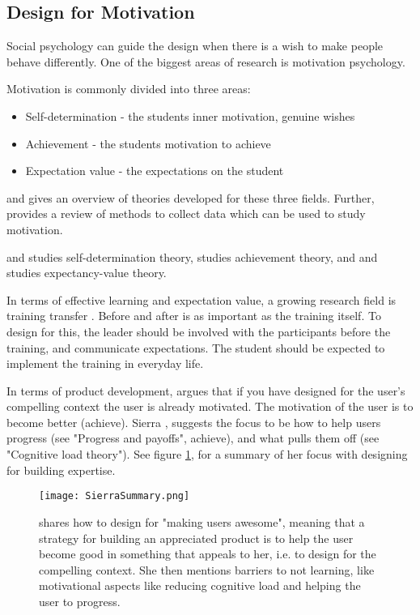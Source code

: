 \subsection{Design for Motivation}

Social psychology can guide the design when there is a wish to make people behave differently. One of the biggest areas of research is motivation psychology.

Motivation is commonly divided into three areas:
\begin{itemize}
\item Self-determination - the students inner motivation, genuine wishes
\item Achievement - the students motivation to achieve
\item Expectation value - the expectations on the student
\end{itemize}

\cite{koballa} and \cite{abell} gives an overview of theories developed for these three fields. Further, \cite{fulmer} provides a review of methods to collect data which can be used to study motivation.

\cite{deci} and \cite{ryan} studies self-determination theory, \cite{elliot} studies achievement theory, and \cite{eccles} and \cite{wigfield} studies expectancy-value theory.

In terms of effective learning and expectation value, a growing research field is training transfer \citep{brinkerhoff}. Before and after is as important as the training itself. To design for this, the leader should be involved with the participants before the training, and communicate expectations. The student should be expected to implement the training in everyday life. \citep{brinkerhoff}

In terms of product development, \cite{sierra} argues that if you have designed for the user's compelling context the user is already motivated. The motivation of the user is to become better (achieve). Sierra \citep{sierra}, suggests the focus to be how to help users progress (see "Progress and payoffs", achieve), and what pulls them off (see "Cognitive load theory"). See figure \ref{fig:sierra-summary}, for a summary of her focus with designing for building expertise.

\begin{figure}[h]
  \centering
  \texttt{[image: SierraSummary.png]}
  \caption{\cite{sierra} shares how to design for "making users awesome", meaning that a strategy for building an appreciated product is to help the user become good in something that appeals to her, i.e. to design for the compelling context. She then mentions barriers to not learning, like motivational aspects like reducing cognitive load and helping the user to progress.}
  \label{fig:sierra-summary}
\end{figure}

